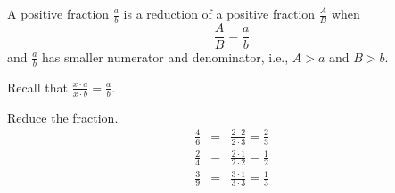 \begin{frame}

\begin{definition}
A positive fraction $\frac{a}{b}$ is a reduction of a positive fraction $\frac{A}{B}$ when
\[
\frac{A}{B} = \frac{a}{b}
\]
and $\frac{a}{b}$ has smaller numerator and denominator, i.e., $A >a$ and $B>b$.
\end{definition}
Recall that $\displaystyle \frac{x\cdot a}{x\cdot b} = \frac{a}{b} $.

\begin{example}
Reduce the fraction.
\[
\renewcommand{\arraystretch}{2}
\begin{array}{rcl}
\displaystyle \frac{4}{6}&=&\displaystyle \frac{2\cdot 2}{2\cdot 3}=\frac{2}{3}\\
\displaystyle \frac{2}{4}&=&\displaystyle \frac{2\cdot 1}{2\cdot 2}=\frac{1}{2}\\
\displaystyle \frac{3}{9}&=&\displaystyle \frac{3\cdot 1}{3\cdot 3}=\frac{1}{3}\\

\end{array}
\]
\end{example}
\end{frame}